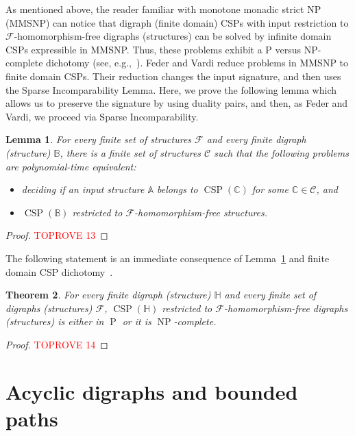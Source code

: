 \documentclass{article}
\newtheorem{theorem}{Theorem}
\newtheorem{lemma}[theorem]{Lemma}
\theoremstyle{definition}
\theoremstyle{remark}
\DeclareMathOperator{\NP}{NP}
\DeclareMathOperator{\cP}{P}
\DeclareMathOperator{\CSP}{CSP}
\newcommand{\bA}{{\mathbb A}}
\newcommand{\bB}{{\mathbb B}}
\newcommand{\bC}{{\mathbb C}}
\newcommand{\bH}{{\mathbb H}}
\newcommand{\calC}{{\mathcal C}}
\newcommand{\calF}{{\mathcal F}}
\begin{document}
As mentioned above, the reader familiar with monotone monadic strict NP (MMSNP) can notice
that digraph (finite domain) CSPs with input restriction to $\calF$-homomorphism-free
digraphs (structures) can be solved by infinite domain CSPs expressible in MMSNP.
Thus, these problems exhibit a P versus NP-complete dichotomy (see,
e.g.,~\cite{MMSNP-Journal,FederVardi}). Feder and Vardi reduce problems in MMSNP to
finite domain CSPs. Their reduction changes the input signature, and then uses the Sparse 
Incomparability Lemma. Here, we prove the following lemma which allows us
to preserve the signature by using duality pairs, and then, as Feder and Vardi, we proceed
via Sparse Incomparability.


\begin{lemma}\label{lem:xDT-T-homfree}
    For every finite set of structures $\calF$ and every finite digraph (structure) $\bB$,
    there is a finite set of structures $\calC$ such that the following problems are
    polynomial-time equivalent:
    \begin{itemize}
        \item deciding if an input structure $\bA$ belongs to $\CSP(\bC)$ for some $\bC\in \calC$, and
        \item $\CSP(\bB)$ restricted to $\calF$-homomorphism-free structures.
    \end{itemize}
\end{lemma}
\begin{proof}\textcolor{red}{TOPROVE 13}\end{proof}

The following statement is an immediate consequence of Lemma~\ref{lem:xDT-T-homfree}
and finite domain CSP dichotomy~\cite{BulatovFVConjecture,Zhuk20}.

\begin{theorem}\label{thm:FO-restructions-complexity-dichotomy}
    For every finite digraph (structure) $\bH$ and every finite set of digraphs (structures)
    $\calF$, $\CSP(\bH)$ restricted to $\calF$-homomorphism-free digraphs (structures) 
    is either in $\cP$ or it is  $\NP$-complete.
\end{theorem}
\begin{proof}\textcolor{red}{TOPROVE 14}\end{proof}




\section{Acyclic digraphs and bounded paths}
\label{sect:acyclic}
\end{document}
